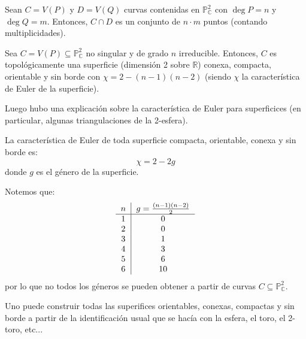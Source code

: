 \documentclass[12pt]{report}
\theoremstyle{largebreak}
\begin{document}
    \begin{theor}
        Sean $C=V(P)$ y $D=V(Q)$ curvas contenidas en $\mathbb{P}^2_{\mathbb{C}}$ con $\deg P=n$ y $\deg Q=m$. Entonces, $C\cap D$ es un conjunto de $n\cdot m$ puntos (contando multiplicidades).
    \end{theor}

    \begin{theor}
        Sea $C=V(P)\subseteq\mathbb{P}^2_{\mathbb{C}}$ no singular y de grado $n$ irreducible. Entonces, $C$ es topológicamente una superficie (dimensión 2 sobre $\mathbb{R}$) conexa, compacta, orientable y sin borde con $\chi=2-(n-1)(n-2)$ (siendo $\chi$ la característica de Euler de la superficie).
    \end{theor}

    Luego hubo una explicación sobre la característica de Euler para superficices (en particular, algunas triangulaciones de la 2-esfera).

    \begin{theor}
        La característica de Euler de toda superficie compacta, orientable, conexa y sin borde es:
        \begin{equation*}
            \chi=2-2g
        \end{equation*}
        donde $g$ es el género de la superficie.
    \end{theor}

    Notemos que:
    \begin{equation*}
        \begin{tabular}{ c | c }
            $n$ & $g=\frac{(n-1)(n-2)}{2}$ \\
            \hline
            1 & 0 \\
            2 & 0 \\
            3 & 1 \\
            4 & 3 \\
            5 & 6 \\
            6 & 10 \\
        \end{tabular}
    \end{equation*}
    por lo que no todos los géneros se pueden obtener a partir de curvas $C\subseteq\mathbb{P}_{\mathbb{C}}^2$.

    Uno puede construir todas las superifices orientables, conexas, compactas y sin borde a partir de la identificación usual que se hacía con la esfera, el toro, el 2-toro, etc...
\end{document}
